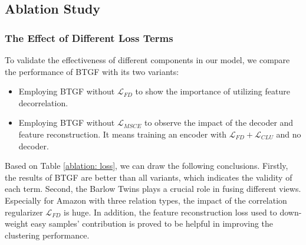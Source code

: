\documentclass[letterpaper]{article} %
\begin{document}
\subsection{Ablation Study}
\subsubsection{The Effect of Different Loss Terms}

To validate the effectiveness of different components in our model, we compare the performance of BTGF with its two variants:
\begin{itemize}
    \item Employing BTGF without $\mathcal{L}_{FD}$ to show the importance of utilizing feature decorrelation. %
    \item Employing BTGF without $\mathcal{L}_{MSCE}$ to observe the impact of the decoder and feature reconstruction. It means training an encoder with $\mathcal{L}_{FD} + \mathcal{L}_{CLU}$ and no decoder. 
\end{itemize}
Based on Table \ref{ablation: loss}, we can draw the following conclusions. Firstly, the results of BTGF are better than all variants, which indicates the validity of each term. Second, the Barlow Twins plays a crucial role in fusing different views. Especially for Amazon with three relation types, the impact of the correlation regularizer $\mathcal{L}_{FD}$ is huge. In addition, the feature reconstruction loss used to down-weight easy samples’ contribution is proved to be helpful in improving the clustering performance.
\end{document}
